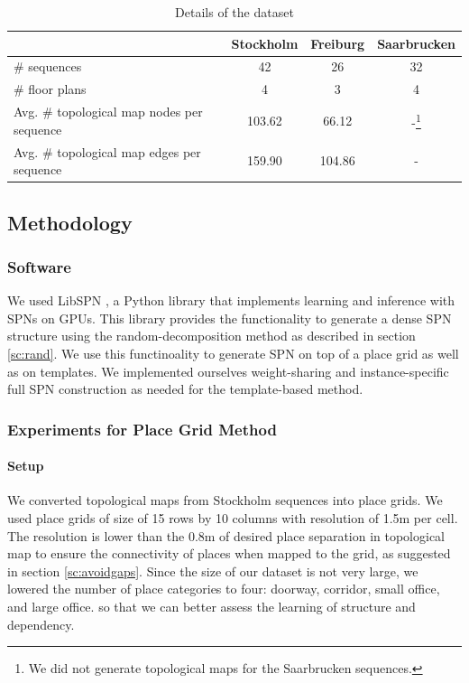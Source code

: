 \documentclass[10pt, titlepage]{article}
\theoremstyle{definition}
\begin{document}
\begin{table}[h!]
\centering
 \begin{tabular}{|l|c|c|c|} 
 \hline
  & Stockholm & Freiburg & Saarbrucken \\ [0.5ex] 
 \hline
 \# sequences & 42 & 26 & 32 \\ 
 \hline
 \# floor plans & 4 & 3 & 4 \\
 \hline
 Avg. \# topological map nodes per sequence & 103.62 & 66.12 & -\footnote{We did not generate topological maps for the Saarbrucken sequences.} \\
 \hline
 Avg. \# topological map edges per sequence & 159.90 & 104.86 & - \\
 \hline
 \end{tabular}
 \caption{Details of the dataset}
 \label{table:dataset}
\end{table}

\subsection{Methodology}\label{section:method}
\subsubsection{Software}
We used LibSPN \cite{pronobis2016learning}, a Python library that implements learning and inference with SPNs on GPUs. This library provides the functionality to generate a dense SPN structure using the random-decomposition method as described in section \ref{sc:rand}. We use this functinoality to generate SPN on top of a place grid as well as on templates. We implemented ourselves weight-sharing and instance-specific full SPN construction as needed for the template-based method. 

\subsubsection{Experiments for Place Grid Method}\label{section:exp-grid}

\paragraph{Setup} We converted topological maps from Stockholm sequences into place grids. We used place grids of size of 15 rows by 10 columns with resolution of 1.5m per cell. The resolution is lower than the 0.8m of desired place separation in topological map to ensure the connectivity of places when mapped to the grid, as suggested in section \ref{sc:avoidgaps}. Since the size of our dataset is not very large, we lowered the number of place categories to four: doorway, corridor, small office, and large office. so that we can better assess the learning of structure and dependency.
\end{document}
